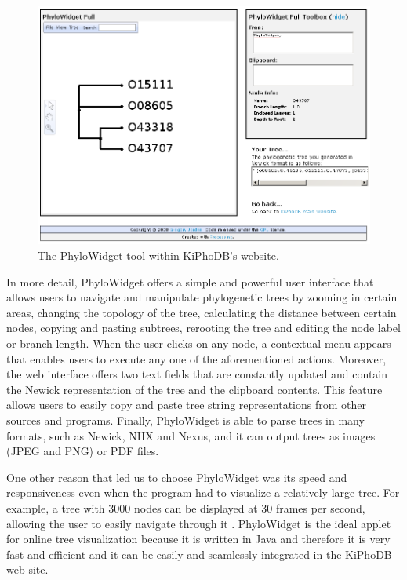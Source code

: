 \begin{figure}[htp]
\centering
\includegraphics[scale=0.4]{pictures/phylowidget.png}
\caption{The PhyloWidget tool within KiPhoDB's website.}
\label{PhyloWidget}
\end{figure}

In more detail, PhyloWidget offers a simple and powerful user interface that allows users to navigate and manipulate phylogenetic trees by zooming in certain areas, changing the topology of the tree, calculating the distance between certain nodes, copying and pasting subtrees, rerooting the tree and editing the node label or branch length.
When the user clicks on any node, a contextual menu appears that enables users to execute any one of the aforementioned actions.
Moreover, the web interface offers two text fields that are constantly updated and contain the Newick representation of the tree and the clipboard contents.
This feature allows users to easily copy and paste tree string representations from other sources and programs.
Finally, PhyloWidget is able to parse trees in many formats, such as Newick, NHX and Nexus, and it can output trees as images (JPEG and PNG) or PDF files.

One other reason that led us to choose PhyloWidget was its speed and responsiveness even when the program had to visualize a relatively large tree.
For example, a tree with 3000 nodes can be displayed at 30 frames per second, allowing the user to easily navigate through it \cite{PhyloWidget}.
PhyloWidget is the ideal applet for online tree visualization because it is written in Java and therefore it is very fast and efficient and it can be easily and seamlessly integrated in the KiPhoDB web site.

